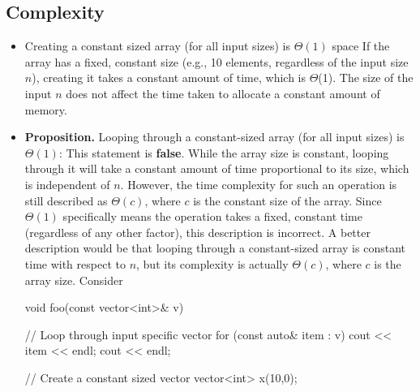 \documentclass{report}
\begin{document}
    \subsection{Complexity}
    \begin{itemize}
        \item Creating a constant sized array (for all input sizes) is $\Theta(1)$ space
            \bigbreak \noindent 
            If the array has a fixed, constant size (e.g., 10 elements, regardless of the input size $n$), creating it takes a constant amount of time, which is $\Theta$(1). The size of the input $n$ does not affect the time taken to allocate a constant amount of memory.
        \item \textbf{Proposition.} Looping through a constant-sized array (for all input sizes) is $\Theta(1)$:
            \bigbreak \noindent 
            This statement is \textbf{false}. While the array size is constant, looping through it will take a constant amount of time proportional to its size, which is independent of $n$. However, the time complexity for such an operation is still described as $\Theta(c)$, where $c$ is the constant size of the array. Since $\Theta(1)$ specifically means the operation takes a fixed, constant time (regardless of any other factor), this description is incorrect.
            \bigbreak \noindent 
            A better description would be that looping through a constant-sized array is constant time with respect to $n$, but its complexity is actually $\Theta(c)$, where $c$ is the array size.
            \bigbreak \noindent 
            Consider
            \bigbreak \noindent 
            \begin{cppcode}
                void foo(const vector<int>& v) {
                    //  Loop through input specific vector
                    for (const auto& item : v) {
                        cout << item << endl;
                    } cout << endl;

                    // Create a constant sized vector
                    vector<int> x(10,0);

}
\end{cppcode}
\end{itemize}
\end{document}
